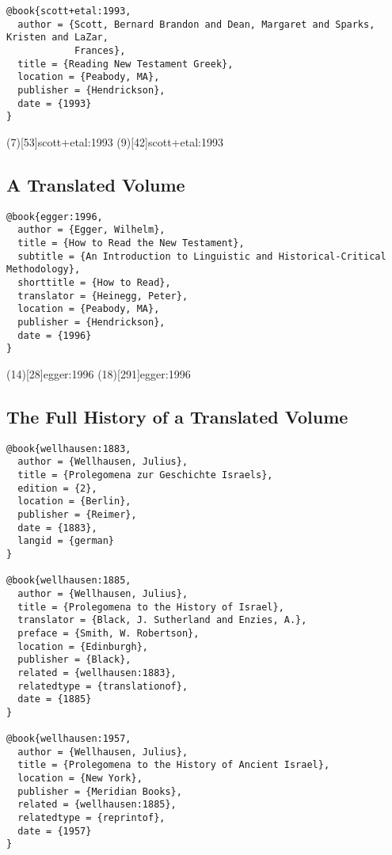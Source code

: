 \documentclass[a4paper]{article}
\begin{document}
\begin{verbatim}
@book{scott+etal:1993,
  author = {Scott, Bernard Brandon and Dean, Margaret and Sparks, Kristen and LaZar,
            Frances},
  title = {Reading New Testament Greek},
  location = {Peabody, MA},
  publisher = {Hendrickson},
  date = {1993}
}
\end{verbatim}

\examplecite(7)[53]{scott+etal:1993}
\examplecite(9)[42]{scott+etal:1993}
\examplebibliography

\subsection{A Translated Volume}

\begin{verbatim}
@book{egger:1996,
  author = {Egger, Wilhelm},
  title = {How to Read the New Testament},
  subtitle = {An Introduction to Linguistic and Historical-Critical Methodology},
  shorttitle = {How to Read},
  translator = {Heinegg, Peter},
  location = {Peabody, MA},
  publisher = {Hendrickson},
  date = {1996}
}
\end{verbatim}

\examplecite(14)[28]{egger:1996}
\examplecite(18)[291]{egger:1996}
\examplebibliography

\subsection{The Full History of a Translated Volume}

\begin{verbatim}
@book{wellhausen:1883,
  author = {Wellhausen, Julius},
  title = {Prolegomena zur Geschichte Israels},
  edition = {2},
  location = {Berlin},
  publisher = {Reimer},
  date = {1883},
  langid = {german}
}

@book{wellhausen:1885,
  author = {Wellhausen, Julius},
  title = {Prolegomena to the History of Israel},
  translator = {Black, J. Sutherland and Enzies, A.},
  preface = {Smith, W. Robertson},
  location = {Edinburgh},
  publisher = {Black},
  related = {wellhausen:1883},
  relatedtype = {translationof},
  date = {1885}
}

@book{wellhausen:1957,
  author = {Wellhausen, Julius},
  title = {Prolegomena to the History of Ancient Israel},
  location = {New York},
  publisher = {Meridian Books},
  related = {wellhausen:1885},
  relatedtype = {reprintof},
  date = {1957}
}
\end{verbatim}
\end{document}
